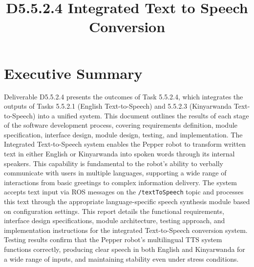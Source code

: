\documentclass{CSSRforAfrica}
\begin{document}



\title{D5.5.2.4 Integrated Text to Speech Conversion}   

\partner{}                                %




\maketitle
 

\section*{Executive Summary}
\label{executive_summary}
 
Deliverable D5.5.2.4 presents the outcomes of Task 5.5.2.4, which integrates the outputs of Tasks 5.5.2.1 (English Text-to-Speech) and 5.5.2.3 (Kinyarwanda Text-to-Speech) into a unified system. This document outlines the results of each stage of the software development process, covering requirements definition, module specification, interface design, module design, testing, and implementation.
The Integrated Text-to-Speech system enables the Pepper robot to transform written text in either English or Kinyarwanda into spoken words through its internal speakers. This capability is fundamental to the robot's ability to verbally communicate with users in multiple languages, supporting a wide range of interactions from basic greetings to complex information delivery. The system accepts text input via ROS messages on the \texttt{/textToSpeech} topic and processes this text through the appropriate language-specific speech synthesis module based on configuration settings.
This report details the functional requirements, interface design specifications, module architecture, testing approach, and implementation instructions for the integrated Text-to-Speech conversion system. Testing results confirm that the Pepper robot's multilingual TTS system functions correctly, producing clear speech in both English and Kinyarwanda for a wide range of inputs, and maintaining stability even under stress conditions.
\end{document}
